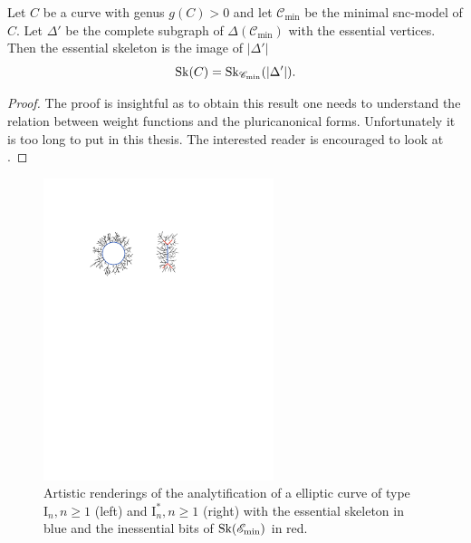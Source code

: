 \begin{theorem}
	Let $C$ be a curve with genus $g(C) > 0$ and let $\mathscr C_\text{min} $ be the minimal snc-model of $C$. 
	Let $\Delta'$ be the complete subgraph of $\Delta(\mathscr C_\text{min} )$ with the essential vertices. 
	Then the essential skeleton is the image of $|\Delta'|$\[
		\operatorname{Sk}(C) = \operatorname{Sk}_{\mathscr C_\text{min} }(|\Delta'|)
	.\] 
\end{theorem}
\begin{proof}
	The proof is insightful as to obtain this result one needs to understand the relation between weight functions and the pluricanonical forms.
	Unfortunately it is too long to put in this thesis. 
	The interested reader is encouraged to look at \cite[thm 3.3.13]{bakerWeightFunctionsBerkovich2016}. 
\end{proof}
\begin{figure}[h]
	\centering
	\includegraphics[width=0.6\textwidth]{chapters/weight/figures/essential_skeleton_elliptic.pdf}
	\caption{Artistic renderings of the analytification of a elliptic curve of type $\mathrm I_n, n \ge 1$ (left) and $\mathrm I_n^*, n \ge 1$ (right) with the essential skeleton in blue and the inessential bits of  $\operatorname{Sk}(\mathscr E_\text{min} )$ in red. }
	\label{fig:}
\end{figure}


